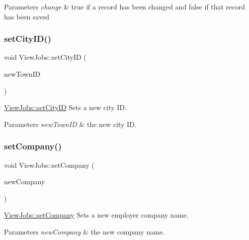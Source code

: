 \begin{DoxyParams}{Parameters}
{\em change} & true if a record has been changed and false if that record has been saved \\
\hline
\end{DoxyParams}
\mbox{\label{class_view_jobs_ad89218b37af85cac9ce6c346efb57e56}} 
\subsubsection{\texorpdfstring{set\+City\+I\+D()}{setCityID()}}
{\footnotesize\ttfamily void View\+Jobs\+::set\+City\+ID (\begin{DoxyParamCaption}\item[{int}]{new\+Town\+ID }\end{DoxyParamCaption})}



\mbox{\hyperlink{class_view_jobs_ad89218b37af85cac9ce6c346efb57e56}{View\+Jobs\+::set\+City\+ID}} Sets a new city ID. 


\begin{DoxyParams}{Parameters}
{\em new\+Town\+ID} & the new city ID. \\
\hline
\end{DoxyParams}
\mbox{\label{class_view_jobs_a596246d07be66a5aeaf14ff8e5649290}} 
\subsubsection{\texorpdfstring{set\+Company()}{setCompany()}}
{\footnotesize\ttfamily void View\+Jobs\+::set\+Company (\begin{DoxyParamCaption}\item[{Q\+String}]{new\+Company }\end{DoxyParamCaption})}



\mbox{\hyperlink{class_view_jobs_a596246d07be66a5aeaf14ff8e5649290}{View\+Jobs\+::set\+Company}} Sets a new employer company name. 


\begin{DoxyParams}{Parameters}
{\em new\+Company} & the new company name. \\
\hline
\end{DoxyParams}
\mbox{\label{class_view_jobs_a7574794410eb40956f343976de97221f}} 
